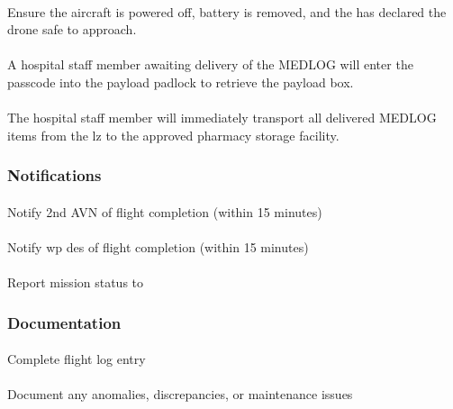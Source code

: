            \paragraph{} Ensure the aircraft is powered off, battery is removed, and the  has declared the drone safe to approach.
            \paragraph{} A hospital staff member awaiting delivery of the MEDLOG will enter the passcode into the payload padlock to retrieve the payload box.
            \paragraph{} The hospital staff member will immediately transport all delivered MEDLOG items from the \ac{lz} to the approved pharmacy storage facility.

        \subsubsection{Notifications}
            \paragraph{} Notify 2nd AVN of flight completion (within 15 minutes)
            \paragraph{} Notify \ac{wp} \ac{des} of flight completion (within 15 minutes)
            \paragraph{} Report mission status to 

        \subsubsection{Documentation}
            \paragraph{} Complete flight log entry
            \paragraph{} Document any anomalies, discrepancies, or maintenance issues
